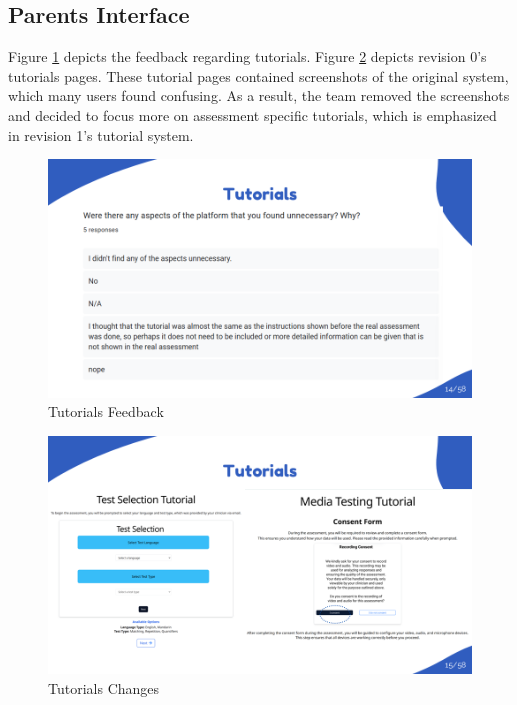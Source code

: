 \documentclass{article}
\begin{document}
\subsection{Parents Interface}

\hspace{2em} Figure \ref{fig:tutorials_feedback} depicts the feedback regarding tutorials. Figure \ref{fig:tutorials_changes} depicts revision 0's tutorials pages.
These tutorial pages contained screenshots of the original system, which many users found confusing. As a result, the team removed the screenshots and decided to focus more on
assessment specific tutorials, which is emphasized in revision 1's tutorial system.

\begin{figure}[H]
  \centering
  \includegraphics[width=\textwidth]{images/slide14.png}
  \caption{Tutorials Feedback}
  \label{fig:tutorials_feedback}
\end{figure}

\begin{figure}[H]
  \centering
  \includegraphics[width=\textwidth]{images/slide15.png}
  \caption{Tutorials Changes}
  \label{fig:tutorials_changes}
\end{figure}
\end{document}
